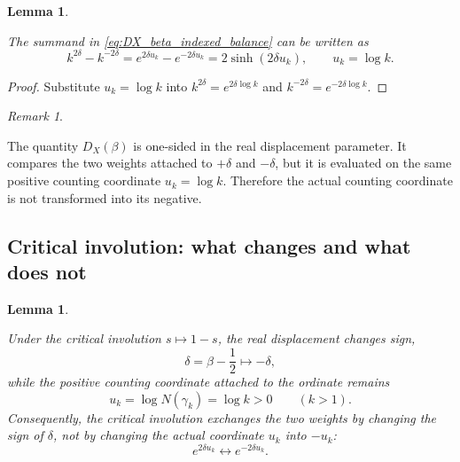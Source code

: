 \documentclass[11pt]{amsart}
\numberwithin{equation}{section}
\theoremstyle{plain}
\newtheorem{lemma}[theorem]{Lemma}
\theoremstyle{definition}
\theoremstyle{remark}
\newtheorem{remark}[theorem]{Remark}
\begin{document}
\begin{lemma}
\label{lem:DX_sinh_form}

The summand in \eqref{eq:DX_beta_indexed_balance} can be written as
\begin{equation}
k^{2\delta}-k^{-2\delta}
=
e^{2\delta u_k}-e^{-2\delta u_k}
=
2\sinh(2\delta u_k),
\qquad
u_k=\log k.
\label{eq:DX_sinh_form}
\end{equation}

\end{lemma}

\begin{proof}
Substitute \(u_k=\log k\) into \(k^{2\delta}=e^{2\delta\log k}\) and \(k^{-2\delta}=e^{-2\delta\log k}\).
\end{proof}

\begin{remark}
\label{rem:Dx_is_one_sided}

The quantity \(D_X(\beta)\) is one-sided in the real displacement parameter.  It compares the two weights attached to \(+\delta\) and \(-\delta\), but it is evaluated on the same positive counting coordinate \(u_k=\log k\).  Therefore the actual counting coordinate is not transformed into its negative.

\end{remark}

\subsection{Critical involution: what changes and what does not}
\label{subsec:critical_involution_what_changes}

\begin{lemma}
\label{lem:critical_involution_changes_delta_not_u}

Under the critical involution \(s\mapsto1-s\), the real displacement changes sign,
\begin{equation}
\delta
=
\beta-\frac{1}{2}
\longmapsto
-
\delta,
\label{eq:critical_involution_changes_delta}
\end{equation}
while the positive counting coordinate attached to the ordinate remains
\begin{equation}
u_k
=
\log N(\gamma_k)
=
\log k
>
0
\qquad
(k>1).
\label{eq:critical_involution_u_stays_positive}
\end{equation}
Consequently, the critical involution exchanges the two weights by changing the sign of \(\delta\), not by changing the actual coordinate \(u_k\) into \(-u_k\):
\begin{equation}
e^{2\delta u_k}
\longleftrightarrow
e^{-2\delta u_k}.
\label{eq:critical_involution_weight_exchange_corrected}
\end{equation}

\end{lemma}
\end{document}
